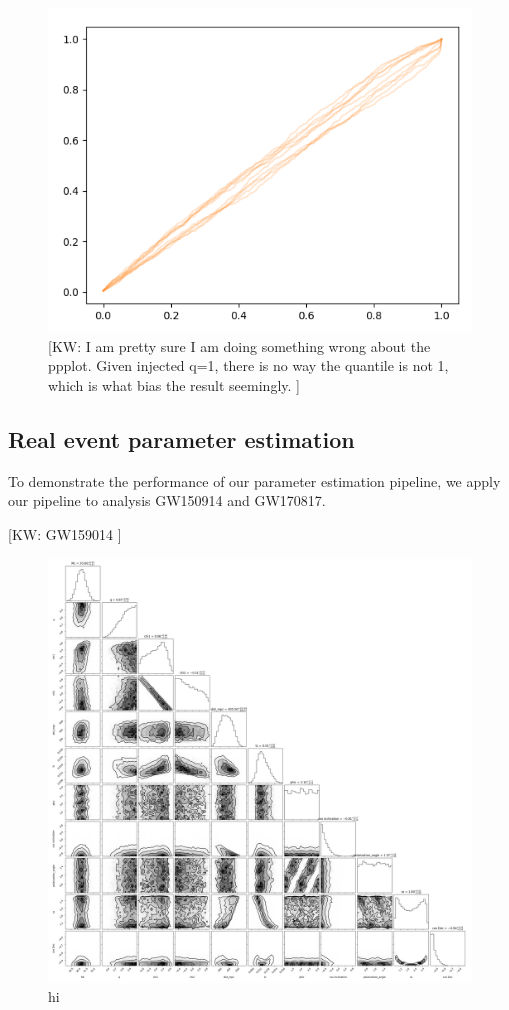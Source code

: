 \documentclass[twocolumn]{aastex631}
\newcommand{\kw}[1]{{\color{rb4}[KW: #1 ]}}
\begin{document}
\begin{figure}
    \includegraphics[width=0.99\linewidth]{static/ppplot.png}
    \caption{ \kw{I am pretty sure I am doing something wrong about the ppplot.
        Given injected q=1, there is no way the quantile is not 1, which is what
        bias the result seemingly.} }
    \label{fig:ppplot}
    \end{figure}

\subsection{Real event parameter estimation}

To demonstrate the performance of our parameter estimation pipeline, we apply
our pipeline to analysis GW150914 and GW170817. 

\kw{GW159014}

\begin{figure}
\includegraphics[width=0.99\linewidth]{static/GW150914.png}
\caption{
    hi
}
\label{fig:GW150914}
\end{figure}
\end{document}
